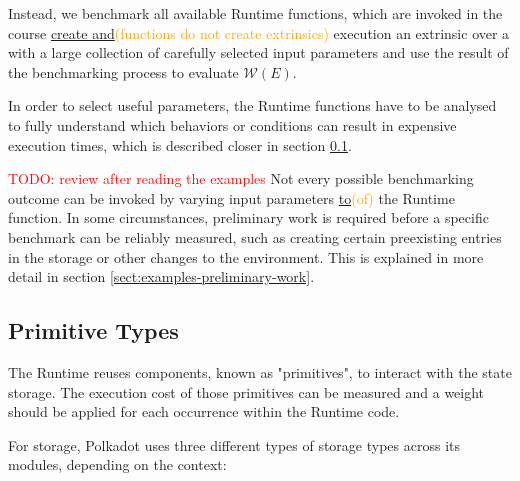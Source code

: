 \documentclass[11pt,a4paper]{article}
\newcommand{\syed}[2]{{\underline{#1}}\textcolor{orange}{(#2)}}
\newcommand{\todo}[1]{\textcolor{red}{TODO: #1}}
\newcommand{\TWF}{\ensuremath{\mathcal{W}}}
\begin{document}
Instead, we benchmark all available Runtime functions, which are invoked in the course \syed{create and}{functions do not create extrinsics} execution an extrinsic over a with a large collection of carefully selected input parameters and use the result of the benchmarking process to evaluate $\TWF(E)$.
\newline

In order to select useful parameters, the Runtime functions have to be analysed to fully understand which behaviors or conditions can result in expensive execution times, which is described closer in section \ref{sect:primitive-types}.

\todo{review after reading the examples} Not every possible benchmarking outcome can be invoked by varying input parameters \syed{to}{of} the Runtime function. In some 
circumstances, preliminary work is required before a specific benchmark can be reliably measured, such as creating certain preexisting entries in the storage or other changes to the environment. This is explained in more detail in section \ref{sect:examples-preliminary-work}.
\newpage

\subsection{Primitive Types}\label{sect:primitive-types}
The Runtime reuses components, known as "primitives", to interact with the state
storage. The execution cost of those primitives can be measured and a weight
should be applied for each occurrence within the Runtime code.
\newline

For storage, Polkadot uses three different types of storage types across its
modules, depending on the context:
\end{document}
